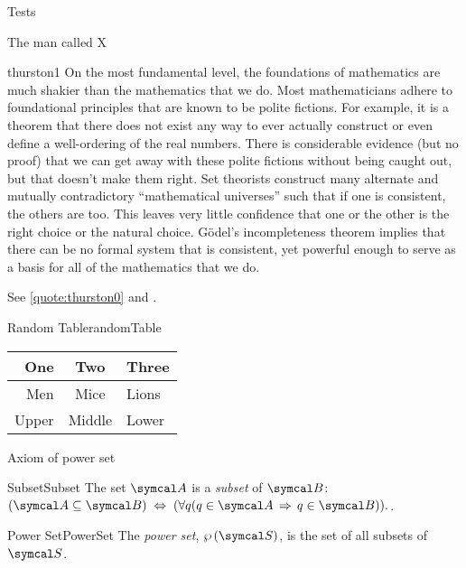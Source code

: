 \documentclass{PalisadesLakesArticle}
\begin{document}
\begin{plSection}{Tests}
\begin{plSection}{The man called X}
\begin{plQuote}
{}
{thurston1}
{On the most fundamental level, the foundations of mathematics 
are much shakier than the mathematics that we do. 
Most mathematicians adhere to foundational principles 
that are known to be polite fictions. 
For example, it is a theorem that there does not exist any way 
to ever actually construct or even define a well-ordering
of the real numbers. 
There is considerable evidence (but no proof) that we can get
away with these polite fictions without being caught out, 
but that doesn’t make them right. 
Set theorists construct many alternate and mutually contradictory
“mathematical universes” such that if one is consistent, 
the others are too. 
This leaves very little confidence that one or the other is 
the right choice or the natural choice. 
G\"odel’s incompleteness theorem implies 
that there can be no formal system that is consistent, 
yet powerful enough to serve as a basis 
for all of the mathematics that we do.}%
\end{plQuote}

See \cref{quote:thurston0} and .

\end{plSection}%

\begin{plTable}{Random Table}{randomTable}
  \begin{tabular}{r|c|l}
  One   & Two    & Three \\\hline\hline
  Men   & Mice   & Lions \\\hline
  Upper & Middle & Lower
  \end{tabular}
  \end{plTable}

\begin{plSection}{Axiom of power set}
\label{sec:Axiom-of-power-set}

\begin{plDefinition}{Subset}{Subset}
The set $\Set{A}$ is a \textsl{subset} of $\Set{B}$:
$
(\Set{A} \subseteq \Set{B}) \;
 \Leftrightarrow \;
 (\forall q (q \in \Set{A} \, \Rightarrow \, q \in \Set{B})).
$.
\end{plDefinition}
 
\begin{plDefinition}{Power Set}{PowerSet}
The \emph{power set}, $\PowerSet{\Set{S}}$,
 is the set of all subsets of $\Set{S}$.
\end{plDefinition}


\end{plSection}
\end{plSection}
\end{document}
